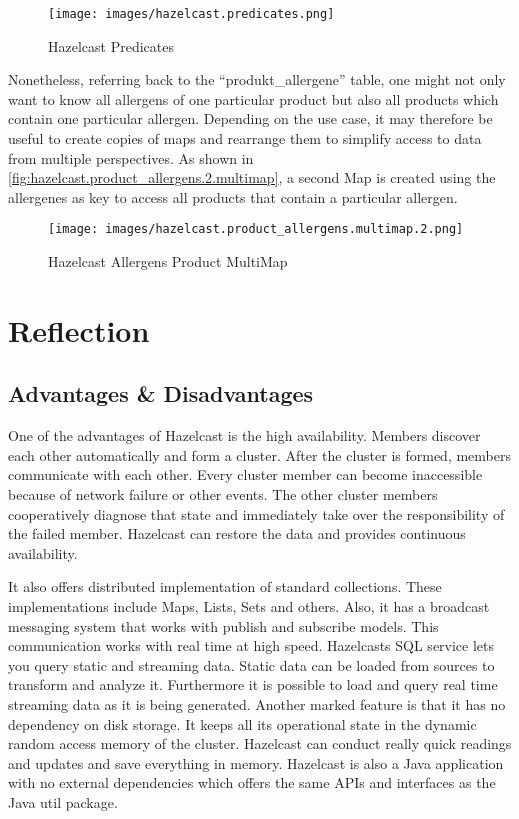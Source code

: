 \begin{figure}[H]
    \centering
    \caption{Hazelcast Predicates} \label{fig:hazelcast.predicates}
    \texttt{[image: images/hazelcast.predicates.png]}
\end{figure}

Nonetheless, referring back to the \enquote{produkt\_allergene} table, one might not only want to know all
allergens of one particular product but also all products which contain one particular allergen.
Depending on the use case, it may therefore be useful to create copies of maps and rearrange them
to simplify access to data from multiple perspectives. As shown in
\autoref{fig:hazelcast.product_allergens.2.multimap}, a second Map is created using the allergenes as key
to access all products that contain a particular allergen.

\begin{figure}[H]
    \centering
    \caption{Hazelcast Allergens Product MultiMap} \label{fig:hazelcast.product_allergens.2.multimap}
    \texttt{[image: images/hazelcast.product\_allergens.multimap.2.png]}
\end{figure}

\section{Reflection} \label{sec:reflectionHazelcast}

\subsection{Advantages \& Disadvantages} \label{subsec:advantagesDisadvantagesHazelcast}

One of the advantages of Hazelcast is the high availability. Members discover each other automatically and form a cluster.
After the cluster is formed, members communicate with each other.  Every cluster member can become inaccessible because of network
failure or other events. The other cluster members cooperatively diagnose that state and immediately take over the responsibility of the failed member. Hazelcast can restore the data and provides continuous availability.

It also offers distributed implementation of standard collections. These implementations include Maps, Lists, Sets and others. Also,
it has a broadcast messaging system that works with publish and subscribe models. This communication works with real time at high speed.
Hazelcasts SQL service lets you query static and streaming data. Static data can be loaded from sources to transform and analyze it.
Furthermore it is possible to load and query real time streaming data as it is being generated.
Another marked feature is that it has no dependency on disk storage. It keeps all its operational state in the dynamic random access
memory of the cluster. Hazelcast can conduct really quick readings and updates and save everything in memory.
Hazelcast is also a Java application with no external dependencies which offers the same APIs and interfaces as the Java util package.

